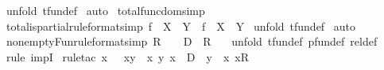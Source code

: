 \begin{isabellebody}
%
\endisadelimproof
%
\isatagproof
{}\isamarkupfalse%
\ {\isacharparenleft}unfold\ tfun{\isacharunderscore}def{\isacharparenright}\isanewline
{}\isamarkupfalse%
\ auto\isanewline
{}\isamarkupfalse%
%
\endisatagproof
{\isafoldproof}%
%
\isadelimproof
\isanewline
%
\endisadelimproof
{}\isamarkupfalse%
\ total{\isacharunderscore}func{\isacharunderscore}dom{\isacharbrackleft}simp{\isacharbrackright}\isanewline
\isanewline
\isanewline
{}\isamarkupfalse%
\ total{\isacharunderscore}is{\isacharunderscore}partial{\isacharbrackleft}rule{\isacharunderscore}format{\isacharcomma}simp{\isacharbrackright}{\isacharcolon}\ {\isachardoublequoteopen}f\ {\isacharcolon}\ {\isacharparenleft}X\ {\isacharminus}{\isacharminus}{\isacharminus}{\isachargreater}\ Y{\isacharparenright}\ {\isacharminus}{\isacharminus}{\isachargreater}\ f\ {\isacharcolon}\ {\isacharparenleft}X\ {\isacharminus}{\isacharbar}{\isacharminus}{\isachargreater}\ Y{\isacharparenright}{\isachardoublequoteclose}\isanewline
%
\isadelimproof
%
\endisadelimproof
%
\isatagproof
{}\isamarkupfalse%
\ {\isacharparenleft}unfold\ tfun{\isacharunderscore}def{\isacharparenright}\isanewline
{}\isamarkupfalse%
\ auto\isanewline
{}\isamarkupfalse%
%
\endisatagproof
{\isafoldproof}%
%
\isadelimproof
\isanewline
%
\endisadelimproof
\isanewline
{}\isamarkupfalse%
\ nonempty{\isacharunderscore}Fun{\isacharbrackleft}rule{\isacharunderscore}format{\isacharcomma}simp{\isacharbrackright}{\isacharcolon}\ {\isachardoublequoteopen}R\ {\isachartilde}{\isacharequal}\ {\isacharbraceleft}{\isacharbraceright}\ {\isacharminus}{\isacharminus}{\isachargreater}\ {\isacharparenleft}D\ {\isacharminus}{\isacharminus}{\isacharminus}{\isachargreater}\ R{\isacharparenright}\ {\isachartilde}{\isacharequal}\ {\isacharbraceleft}{\isacharbraceright}{\isachardoublequoteclose}\isanewline
%
\isadelimproof
%
\endisadelimproof
%
\isatagproof
{}\isamarkupfalse%
\ {\isacharparenleft}unfold\ tfun{\isacharunderscore}def\ pfun{\isacharunderscore}def\ rel{\isacharunderscore}def{\isacharparenright}\isanewline
{}\isamarkupfalse%
\ {\isacharparenleft}rule\ impI{\isacharparenright}\isanewline
{}\isamarkupfalse%
\ {\isacharparenleft}rule{\isacharunderscore}tac\ x\ {\isacharequal}\ {\isachardoublequoteopen}{\isacharbraceleft}\ {\isacharparenleft}x{\isacharcomma}y{\isacharparenright}\ {\isacharbar}\ x\ y{\isachardot}\ x\ {\isacharcolon}\ D\ {\isacharampersand}\ y\ {\isacharequal}\ {\isacharparenleft}{\isacharat}x{\isachardot}\ x{\isacharcolon}R{\isacharparenright}\ {\isacharbraceright}{\isachardoublequoteclose}\ \isanewline

\end{isabellebody}
